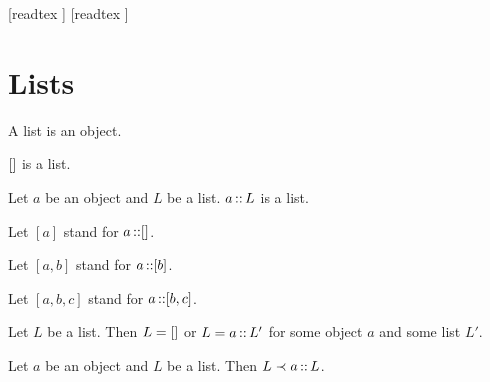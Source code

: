 \documentclass[10pt]{article}
\begin{document}
  \begin{imports}
    \begin{forthel}
      [readtex ]
      [readtex ]
    \end{forthel}
  \end{imports}


  \section*{Lists}

  \begin{forthel}
    \begin{signature}[id=LISTS_LISTS_4578620297183232,printid]
      A list is an object.
    \end{signature}
  \end{forthel}

  \begin{forthel}
    \begin{signature}[id=LISTS_LISTS_3703161885818880,printid]
      $[]$ is a list.
    \end{signature}
  \end{forthel}

  \begin{forthel}
    \begin{signature}[id=LISTS_LISTS_8050301789536256,printid]
      Let $a$ be an object and $L$ be a list.
      $a \mathop{::} L$ is a list.
    \end{signature}
  \end{forthel}

  \begin{forthel}
    Let $[a]$ stand for $a \mathop{::} []$.
    
    Let $[a,b]$ stand for $a \mathop{::} [b]$.
    
    Let $[a,b,c]$ stand for $a \mathop{::} [b,c]$.
  \end{forthel}

  \begin{forthel}
    \begin{axiom}[id=LISTS_LISTS_4512036658964875,printid]
      Let $L$ be a list.
      Then $L = []$ or $L = a \mathop{::} L'$ for some object $a$ and some list $L'$.
    \end{axiom}
  \end{forthel}

  \begin{forthel}
    \begin{axiom}[id=LISTS_LISTS_1021563255448756,printid]
      Let $a$ be an object and $L$ be a list.
      Then $L \prec a \mathop{::} L$.
    \end{axiom}
  \end{forthel}
\end{document}
